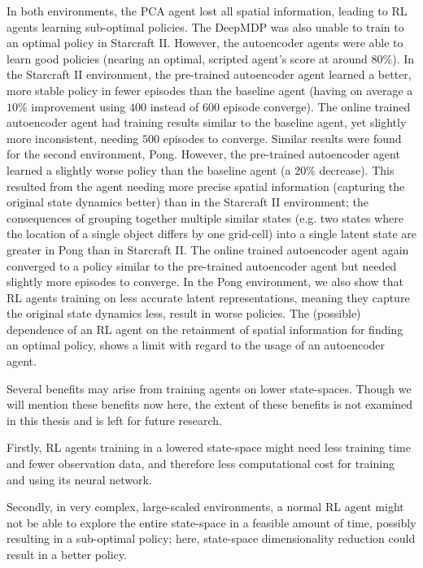 In both environments, the PCA agent lost all spatial information, leading to RL agents learning sub-optimal policies. The DeepMDP was also unable to train to an optimal policy in Starcraft II. However, the autoencoder agents were able to learn good policies (nearing an optimal, scripted agent's score at around $80\%$). In the Starcraft II environment, the pre-trained autoencoder agent learned a better, more stable policy in fewer episodes than the baseline agent (having on average a $10\%$ improvement using $400$ instead of $600$ episode converge). The online trained autoencoder agent had training results similar to the baseline agent, yet slightly more inconsistent, needing $500$ episodes to converge. Similar results were found for the second environment, Pong. However, the pre-trained autoencoder agent learned a slightly worse policy than the baseline agent (a $20\%$ decrease). This resulted from the agent needing more precise spatial information (capturing the original state dynamics better) than in the Starcraft II environment; the consequences of grouping together multiple similar states (e.g. two states where the location of a single object differs by one grid-cell) into a single latent state are greater in Pong than in Starcraft II. The online trained autoencoder agent again converged to a policy similar to the pre-trained autoencoder agent but needed slightly more episodes to converge. In the Pong environment, we also show that RL agents training on less accurate latent representations, meaning they capture the original state dynamics less, result in worse policies. The (possible) dependence of an RL agent on the retainment of spatial information for finding an optimal policy, shows a limit with regard to the usage of an autoencoder agent.

Several benefits may arise from training agents on lower state-spaces. Though we will mention these benefits now here, the extent of these benefits is not examined in this thesis and is left for future research.

Firstly, RL agents training in a lowered state-space might need less training time and fewer observation data, and therefore less computational cost for training and using its neural network. 

Secondly, in very complex, large-scaled environments, a normal RL agent might not be able to explore the entire state-space in a feasible amount of time, possibly resulting in a sub-optimal policy; here, state-space dimensionality reduction could result in a better policy. 

